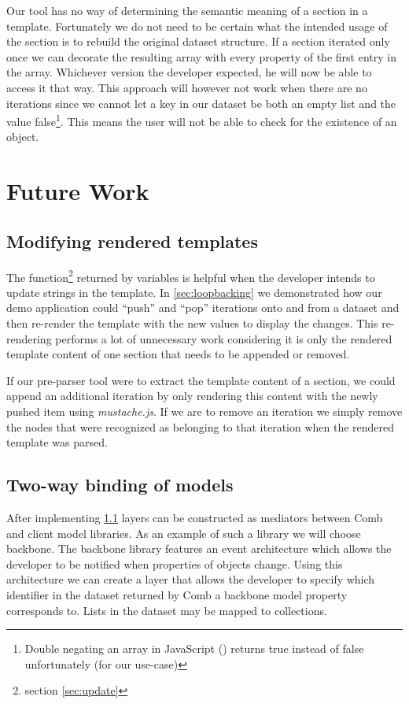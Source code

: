 \documentclass[thesis.tex]{subfiles}
\begin{document}
Our tool has no way of determining the semantic meaning of a section in a
template.
Fortunately we do not need to be certain what the intended usage of the section
is to rebuild the original dataset structure.
If a section iterated only once we can decorate the resulting array with every
property of the first entry in the array. Whichever version the developer
expected, he will now be able to access it that way. This approach will however
not work when there are no iterations since we cannot let a key in our dataset
be both an empty list and the value false\footnote{
	Double negating an array in JavaScript (\inline{\!\![]}) returns true instead
	of false unfortunately (for our use-case)
}. This means the user will not be able to check for the existence of an object.




\section{Future Work}

\subsection{Modifying rendered templates}
\label{sec:update-dom}
The  function\footnote{section \ref{sec:update}} returned by
variables is helpful when the developer intends to update strings in the
template. In \ref{sec:loopbacking} we demonstrated how our demo application
could ``push'' and ``pop'' iterations onto and from a dataset and then re-render
the template with the new values to display the changes.
This re-rendering performs a lot of unnecessary work considering it is only
the rendered template content of one section that needs to be appended or
removed.

If our pre-parser tool were to extract the template content of a section, we
could append an additional iteration by only rendering this content with the
newly pushed item using \emph{mustache.js}.
If we are to remove an iteration we simply remove the nodes that were recognized
as belonging to that iteration when the rendered template was parsed.

\subsection{Two-way binding of models}
\label{sec:two-way-binding}
After implementing \ref{sec:update-dom} layers can be constructed as
mediators between Comb and client model libraries. As an example of such a
library we will choose backbone. The backbone library features an event
architecture which allows the developer to be notified when properties of
objects change. Using this architecture we can create a layer that allows the
developer to specify which identifier in the dataset returned by Comb a
backbone model property corresponds to. Lists in the dataset may be mapped to
collections.
\end{document}
